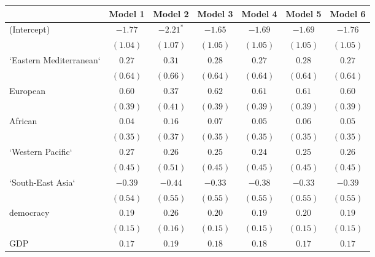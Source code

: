 
\begin{table}[!h]
\begin{center}
\begin{tabular}{l c c c c c c }
\toprule
 & Model 1 & Model 2 & Model 3 & Model 4 & Model 5 & Model 6 \\
\midrule
(Intercept)             & $-1.77$      & $-2.21^{*}$  & $-1.65$      & $-1.69$      & $-1.69$      & $-1.76$      \\
                        & $(1.04)$     & $(1.07)$     & $(1.05)$     & $(1.05)$     & $(1.05)$     & $(1.05)$     \\
`Eastern Mediterranean` & $0.27$       & $0.31$       & $0.28$       & $0.27$       & $0.28$       & $0.27$       \\
                        & $(0.64)$     & $(0.66)$     & $(0.64)$     & $(0.64)$     & $(0.64)$     & $(0.64)$     \\
European                & $0.60$       & $0.37$       & $0.62$       & $0.61$       & $0.61$       & $0.60$       \\
                        & $(0.39)$     & $(0.41)$     & $(0.39)$     & $(0.39)$     & $(0.39)$     & $(0.39)$     \\
African                 & $0.04$       & $0.16$       & $0.07$       & $0.05$       & $0.06$       & $0.05$       \\
                        & $(0.35)$     & $(0.37)$     & $(0.35)$     & $(0.35)$     & $(0.35)$     & $(0.35)$     \\
`Western Pacific`       & $0.27$       & $0.26$       & $0.25$       & $0.24$       & $0.25$       & $0.26$       \\
                        & $(0.45)$     & $(0.51)$     & $(0.45)$     & $(0.45)$     & $(0.45)$     & $(0.45)$     \\
`South-East Asia`       & $-0.39$      & $-0.44$      & $-0.33$      & $-0.38$      & $-0.33$      & $-0.39$      \\
                        & $(0.54)$     & $(0.55)$     & $(0.55)$     & $(0.55)$     & $(0.55)$     & $(0.55)$     \\
democracy               & $0.19$       & $0.26$       & $0.20$       & $0.19$       & $0.20$       & $0.19$       \\
                        & $(0.15)$     & $(0.16)$     & $(0.15)$     & $(0.15)$     & $(0.15)$     & $(0.15)$     \\
GDP                     & $0.17$       & $0.19$       & $0.18$       & $0.18$       & $0.17$       & $0.17$       \\

\end{tabular}
\end{center}
\end{table}

